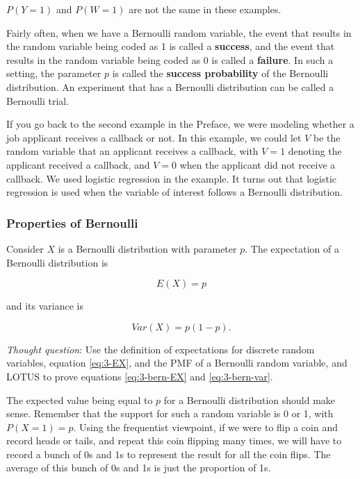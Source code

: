 \documentclass[
]{book}
\begin{document}
\(P(Y=1)\) and \(P(W=1)\) are not the same in these examples.

Fairly often, when we have a Bernoulli random variable, the event that results in the random variable being coded as 1 is called a \textbf{success}, and the event that results in the random variable being coded as 0 is called a \textbf{failure}. In such a setting, the parameter \(p\) is called the \textbf{success probability} of the Bernoulli distribution. An experiment that has a Bernoulli distribution can be called a Bernoulli trial.

If you go back to the second example in the Preface, we were modeling whether a job applicant receives a callback or not. In this example, we could let \(V\) be the random variable that an applicant receives a callback, with \(V=1\) denoting the applicant received a callback, and \(V=0\) when the applicant did not receive a callback. We used logistic regression in the example. It turns out that logistic regression is used when the variable of interest follows a Bernoulli distribution.

\hypertarget{bernprop}{%
\subsubsection{Properties of Bernoulli}\label{bernprop}}

Consider \(X\) is a Bernoulli distribution with parameter \(p\). The expectation of a Bernoulli distribution is

\begin{equation} 
E(X) = p
\label{eq:3-bern-EX}
\end{equation}

and its variance is

\begin{equation} 
Var(X) = p(1-p).
\label{eq:3-bern-var}
\end{equation}

\emph{Thought question}: Use the definition of expectations for discrete random variables, equation \eqref{eq:3-EX}, and the PMF of a Bernoulli random variable, and LOTUS to prove equations \eqref{eq:3-bern-EX} and \eqref{eq:3-bern-var}.

The expected value being equal to \(p\) for a Bernoulli distribution should make sense. Remember that the support for such a random variable is 0 or 1, with \(P(X=1) = p\). Using the frequentist viewpoint, if we were to flip a coin and record heads or tails, and repeat this coin flipping many times, we will have to record a bunch of 0s and 1s to represent the result for all the coin flips. The average of this bunch of 0s and 1s is just the proportion of 1s.
\end{document}

